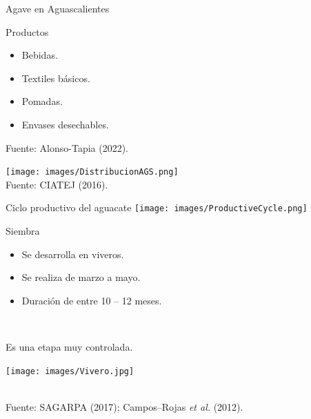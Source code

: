 \documentclass[aspectratio=169]{beamer}
\begin{document}
\begin{frame}{Agave en Aguascalientes}
	\vspace{-1cm}
	\begin{minipage}{0.5\textwidth}
		\begin{block}{Productos}
			\begin{itemize}
				\item Bebidas.
				\item Textiles básicos.
				\item Pomadas.
				\item Envases desechables.
			\end{itemize}
			{\scriptsize Fuente: Alonso-Tapia (2022).}
		\end{block}
	\end{minipage}%
	\begin{minipage}{0.5\textwidth}
		\centering\texttt{[image: images/DistribucionAGS.png]}\\\hfill {\scriptsize Fuente: CIATEJ (2016).}
	\end{minipage}%
\end{frame}



\begin{frame}{Ciclo productivo del aguacate}
    \texttt{[image: images/ProductiveCycle.png]}
\end{frame}

\begin{frame}{Siembra}
    \vspace{-1cm}
		\begin{minipage}{0.5\textwidth}
            \begin{block}{}
                \begin{itemize}
				\item Se desarrolla en viveros.
                    \item Se realiza de marzo a mayo.
                    \item Duración de entre 10 -- 12 meses.
			\end{itemize}
            \end{block}
            \pause\,\\
            \begin{block}{Es una etapa muy controlada.}
            \end{block}
		\end{minipage}%
        \begin{minipage}{0.5\textwidth}
        \centering
\texttt{[image: images/Vivero.jpg]}
		\end{minipage}%
        \,\\
        \hfill {\scriptsize Fuente: SAGARPA (2017); Campos–Rojas \textit{et al.} (2012).}
\end{frame}
\end{document}
